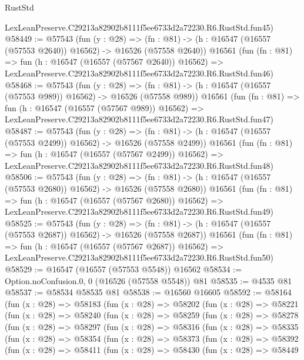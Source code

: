 \begin{lexlean}{RustStd}
\begin{coremodule}
    LexLeanPreserve.C29213a82902b8111f5ee6733d2a72230.R6.RustStd.fun45)
@58449 := @57543
    (fun (y : @28) =>
    (fn : @81) -> (h : @16547 (@16557 (@57553 @2640)) @16562) -> @16526 (@57558 @2640))
    @16561
    (fun (fn : @81) =>
    fun (h : @16547 (@16557 (@57567 @2640)) @16562) =>
    LexLeanPreserve.C29213a82902b8111f5ee6733d2a72230.R6.RustStd.fun46)
@58468 := @57543
    (fun (y : @28) =>
    (fn : @81) -> (h : @16547 (@16557 (@57553 @989)) @16562) -> @16526 (@57558 @989))
    @16561
    (fun (fn : @81) =>
    fun (h : @16547 (@16557 (@57567 @989)) @16562) =>
    LexLeanPreserve.C29213a82902b8111f5ee6733d2a72230.R6.RustStd.fun47)
@58487 := @57543
    (fun (y : @28) =>
    (fn : @81) -> (h : @16547 (@16557 (@57553 @2499)) @16562) -> @16526 (@57558 @2499))
    @16561
    (fun (fn : @81) =>
    fun (h : @16547 (@16557 (@57567 @2499)) @16562) =>
    LexLeanPreserve.C29213a82902b8111f5ee6733d2a72230.R6.RustStd.fun48)
@58506 := @57543
    (fun (y : @28) =>
    (fn : @81) -> (h : @16547 (@16557 (@57553 @2680)) @16562) -> @16526 (@57558 @2680))
    @16561
    (fun (fn : @81) =>
    fun (h : @16547 (@16557 (@57567 @2680)) @16562) =>
    LexLeanPreserve.C29213a82902b8111f5ee6733d2a72230.R6.RustStd.fun49)
@58525 := @57543
    (fun (y : @28) =>
    (fn : @81) -> (h : @16547 (@16557 (@57553 @2687)) @16562) -> @16526 (@57558 @2687))
    @16561
    (fun (fn : @81) =>
    fun (h : @16547 (@16557 (@57567 @2687)) @16562) =>
    LexLeanPreserve.C29213a82902b8111f5ee6733d2a72230.R6.RustStd.fun50)
@58529 := @16547 (@16557 (@57553 @5548)) @16562
@58534 := Option.noConfusion.{0, 0} (@16526 (@57558 @5548)) @81
@58535 := @4535 @81
@58537 := @58534 @58535 @81
@58538 := @16560 @16605
@58592 := @58164
    (fun (x : @28) =>
    @58183
      (fun (x : @28) =>
      @58202
        (fun (x : @28) =>
        @58221
          (fun (x : @28) =>
          @58240
            (fun (x : @28) =>
            @58259
              (fun (x : @28) =>
              @58278
                (fun (x : @28) =>
                @58297
                  (fun (x : @28) =>
                  @58316
                    (fun (x : @28) =>
                    @58335
                      (fun (x : @28) =>
                      @58354
                        (fun (x : @28) =>
                        @58373
                          (fun (x : @28) =>
                          @58392
                            (fun (x : @28) =>
                            @58411
                              (fun (x : @28) =>
                              @58430
                                (fun (x : @28) =>
                                @58449

\end{coremodule}
\end{lexlean}
